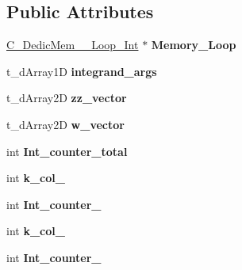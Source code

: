 \subsection*{Public Attributes}
\begin{DoxyCompactItemize}
\item 
\hypertarget{class_c___two_loop_integrator_ac15acb069ff7ef406563ae87a04270bf}{\hyperlink{class_c___dedic_mem__2___loop___int}{C\-\_\-\-Dedic\-Mem\-\_\-\_\-\-Loop\-\_\-\-Int} $\ast$ {\bfseries Memory\-\_\-\-Loop}}\label{class_c___two_loop_integrator_ac15acb069ff7ef406563ae87a04270bf}

\item 
\hypertarget{class_c___two_loop_integrator_aa24d4d6a1431a90423751db8bb88d763}{t\-\_\-d\-Array1\-D {\bfseries integrand\-\_\-args}}\label{class_c___two_loop_integrator_aa24d4d6a1431a90423751db8bb88d763}

\item 
\hypertarget{class_c___two_loop_integrator_a889c517f1c3b39ecc663a77f52f30927}{t\-\_\-d\-Array2\-D {\bfseries zz\-\_\-vector}}\label{class_c___two_loop_integrator_a889c517f1c3b39ecc663a77f52f30927}

\item 
\hypertarget{class_c___two_loop_integrator_a5a20ee4c750f9e29f0bd83c3b8a92413}{t\-\_\-d\-Array2\-D {\bfseries w\-\_\-vector}}\label{class_c___two_loop_integrator_a5a20ee4c750f9e29f0bd83c3b8a92413}

\item 
\hypertarget{class_c___two_loop_integrator_a440f25460be810c434e7144e88259b93}{int {\bfseries Int\-\_\-counter\-\_\-total}}\label{class_c___two_loop_integrator_a440f25460be810c434e7144e88259b93}

\item 
\hypertarget{class_c___two_loop_integrator_a111f66c31de3af13e558df77eefa7360}{int {\bfseries k\-\_\-col\-\_}}\label{class_c___two_loop_integrator_a111f66c31de3af13e558df77eefa7360}

\item 
\hypertarget{class_c___two_loop_integrator_a98fa1572bb421a14b8c137ef71fd0137}{int {\bfseries Int\-\_\-counter\-\_}}\label{class_c___two_loop_integrator_a98fa1572bb421a14b8c137ef71fd0137}

\item 
\hypertarget{class_c___two_loop_integrator_a1e794739dd49381530004e0a2878a676}{int {\bfseries k\-\_\-col\-\_}}\label{class_c___two_loop_integrator_a1e794739dd49381530004e0a2878a676}

\item 
\hypertarget{class_c___two_loop_integrator_a82bd1b1dffda484204104dcabe79a151}{int {\bfseries Int\-\_\-counter\-\_}}\label{class_c___two_loop_integrator_a82bd1b1dffda484204104dcabe79a151}


\end{DoxyCompactItemize}
